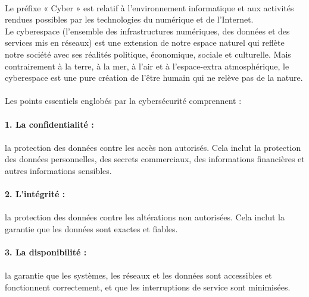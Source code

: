 \paragraph{ }
Le préfixe « Cyber » est relatif à l’environnement informatique et aux activités
rendues possibles par les technologies du numérique et de l’Internet.\\
 Le cyberespace
(l’ensemble des infrastructures numériques, des données et des services mis en
réseaux) est une extension de notre espace naturel qui reflète notre société avec ses
réalités politique, économique, sociale et culturelle. Mais contrairement à la terre, à
la mer, à l’air et à l’espace-extra atmosphérique, le cyberespace est une pure création
de l’être humain qui ne relève pas de la nature.

\paragraph{ }
Les points essentiels englobés par la cybersécurité comprennent :
\space  


\paragraph{1. La confidentialité :}\paragraph{} la protection des données contre les accès non autorisés. Cela inclut la protection des données personnelles, des secrets commerciaux, des informations financières et autres informations sensibles.

\paragraph{2. L'intégrité :}\paragraph{} la protection des données contre les altérations non autorisées. Cela inclut la garantie que les données sont exactes et fiables.

\paragraph{3. La disponibilité :} \paragraph{}la garantie que les systèmes, les réseaux et les données sont accessibles et fonctionnent correctement, et que les interruptions de service sont minimisées.

